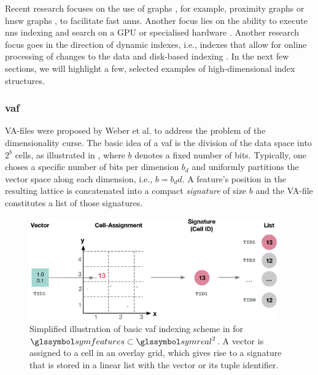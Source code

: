 Recent research focuses on the use of graphs \cite{Shimomura:2021Survey}, for example, proximity graphs \cite{Zhao:2022Approximate} or \acrfull{hnsw} graphs \cite{Malkov:2018Efficient,Chen:2021SPANN}, to facilitate fast \acrshort{anns}. Another focus lies on the ability to execute \acrshort{nns} indexing and search on a GPU \cite{Johnson:2019Billion,Zhao:2020Song} or specialised hardware \cite{Lee:2022Anna}. Another research focus goes in the direction of dynamic indexes, i.e., indexes that allow for online processing of changes to the data \cite{Olafsson:2011Dynamic,Zhao:2022Approximate} and disk-based indexing \cite{Jayaram:2019DiskANN}. In the next few sections, we will highlight a few, selected examples of high-dimensional index structures.

\subsubsection{\texorpdfstring{\acrfull{vaf}}{Vector Approximation File (VAF)}}
\label{section:index_vaf}

VA-files were proposed by Weber et al. \cite{Weber:1998Va} to address the problem of the dimensionality curse. The basic idea of a \acrshort{vaf} is the division of the data space into $2^b$ cells, as illustrated in , where $b$ denotes a fixed number of bits. Typically, one choses a specific number of bits per dimension $b_d$ and uniformly partitions the vector space along each dimension, i.e., $b = b_dd$. A feature's position in the resulting lattice is concatenated into a compact \emph{signature} of size $b$ and the VA-file constitutes a list of those signatures. 

\begin{figure}[tb]
\centering
\includegraphics[width=0.95\textwidth]{figures/vaf}
\caption{Simplified illustration of basic \acrshort{vaf} indexing scheme in for $\symfeatures \subset \symreal^2$. A vector is assigned to a cell in an overlay grid, which gives rise to a signature that is stored in a linear list with the vector or its tuple identifier.}
\label{fig:vaf}
\end{figure}

